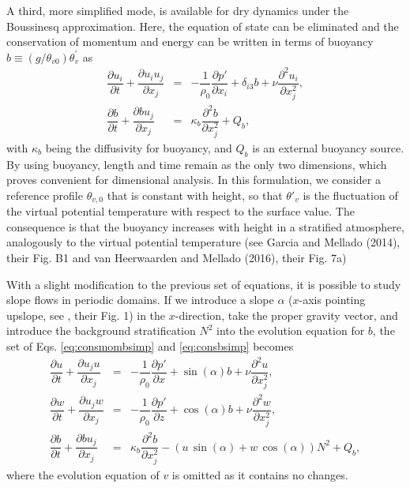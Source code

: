 \documentclass[gmd,manuscript]{copernicus}
\begin{document}
A third, more simplified mode, is available for dry dynamics under the Boussinesq approximation. Here, the equation of state can be eliminated and the conservation of momentum and energy can be written in terms of buoyancy $b \equiv \left( g/\theta_{v0} \right) \theta_v^\prime$ as
\begin{eqnarray}
\dfrac{\partial u_i}{\partial t} + \dfrac{\partial u_i u_j}{\partial x_j} & = & 
- \dfrac{1}{\rho_0}\dfrac{\partial p'}{\partial x_i} + \delta_{i3} b + \nu \dfrac{\partial^2 u_i}{\partial x_j^2}\label{eq:consmombsimp},\\
\dfrac{\partial b}{\partial t} + \dfrac{\partial b u_j}{\partial x_j} & = & 
\kappa_b \dfrac{\partial^2 b}{\partial x_j^2} + Q_b \label{eq:consbsimp},
\end{eqnarray}
with $\kappa_b$ being the diffusivity for buoyancy, and $Q_b$ is an external buoyancy source. By using buoyancy, length and time remain as the only two dimensions, which proves convenient for dimensional analysis. In this formulation, we consider a reference profile $\theta_{v,0}$ that is constant with height, so that $\theta'_v$ is the fluctuation of the virtual potential temperature with respect to the surface value. The consequence is that the buoyancy increases with height in a stratified atmosphere, analogously to the virtual potential temperature (see Garcia and Mellado (2014), their Fig. B1 and van Heerwaarden and Mellado (2016), their Fig. 7a)

With a slight modification to the previous set of equations, it is possible to study slope flows in periodic domains. If we introduce a slope $\alpha$ ($x$-axis pointing upslope, see \citet{Fedorovich2009}, their Fig. 1) in the $x$-direction, take the proper gravity vector, and introduce the background stratification $N^2$ into the evolution equation for $b$, the set of Eqs. \ref{eq:consmombsimp} and \ref{eq:consbsimp} becomes
\begin{eqnarray}
\dfrac{\partial u}{\partial t} + \dfrac{\partial u_j u}{\partial x_j} & = & 
- \dfrac{1}{\rho_0}\dfrac{\partial p'}{\partial x} + \sin(\alpha) b + \nu \dfrac{\partial^2 u}{\partial x_j^2}\label{eq:consuslope},\\
\dfrac{\partial w}{\partial t} + \dfrac{\partial u_j w}{\partial x_j} & = & 
- \dfrac{1}{\rho_0}\dfrac{\partial p'}{\partial z} + \cos(\alpha) b + \nu \dfrac{\partial^2 w}{\partial x_j^2}\label{eq:conswslope},\\
\dfrac{\partial b}{\partial t} + \dfrac{\partial b u_j}{\partial x_j} & = & 
\kappa_b \dfrac{\partial^2 b}{\partial x_j^2} - \left (u\,\sin(\alpha) + w\,\cos(\alpha) \right) N^2 + Q_b,\label{eq:consbslope}
\end{eqnarray}
where the evolution equation of $v$ is omitted as it contains no changes.
\end{document}
